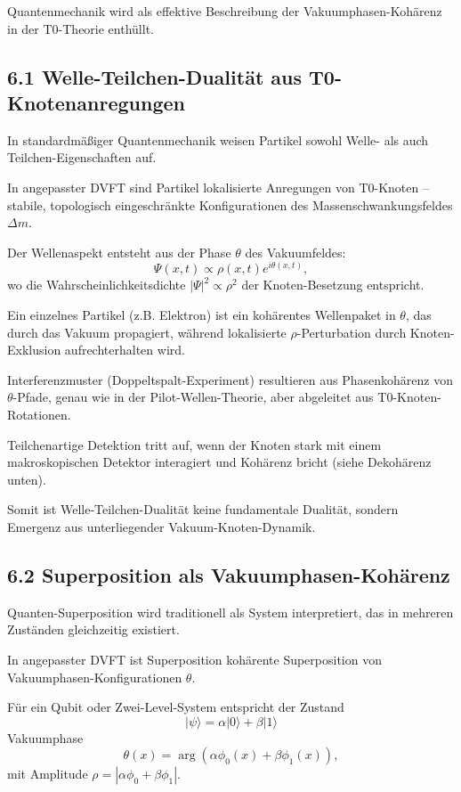	Quantenmechanik wird als effektive Beschreibung der Vakuumphasen-Kohärenz in der T0-Theorie enthüllt.
	
	\subsection{6.1 Welle-Teilchen-Dualität aus T0-Knotenanregungen}
	
	In standardmäßiger Quantenmechanik weisen Partikel sowohl Welle- als auch Teilchen-Eigenschaften auf.
	
	In angepasster DVFT sind Partikel lokalisierte Anregungen von T0-Knoten – stabile, topologisch eingeschränkte Konfigurationen des Massenschwankungsfeldes $\Delta m$.
	
	Der Wellenaspekt entsteht aus der Phase $\theta$ des Vakuumfeldes:
	\[
	\Psi(x,t) \propto \rho(x,t) e^{i\theta(x,t)},
	\]
	wo die Wahrscheinlichkeitsdichte $|\Psi|^2 \propto \rho^2$ der Knoten-Besetzung entspricht.
	
	Ein einzelnes Partikel (z.B. Elektron) ist ein kohärentes Wellenpaket in $\theta$, das durch das Vakuum propagiert, während lokalisierte $\rho$-Perturbation durch Knoten-Exklusion aufrechterhalten wird.
	
	Interferenzmuster (Doppeltspalt-Experiment) resultieren aus Phasenkohärenz von $\theta$-Pfade, genau wie in der Pilot-Wellen-Theorie, aber abgeleitet aus T0-Knoten-Rotationen.
	
	Teilchenartige Detektion tritt auf, wenn der Knoten stark mit einem makroskopischen Detektor interagiert und Kohärenz bricht (siehe Dekohärenz unten).
	
	Somit ist Welle-Teilchen-Dualität keine fundamentale Dualität, sondern Emergenz aus unterliegender Vakuum-Knoten-Dynamik.
	
	\subsection{6.2 Superposition als Vakuumphasen-Kohärenz}
	
	Quanten-Superposition wird traditionell als System interpretiert, das in mehreren Zuständen gleichzeitig existiert.
	
	In angepasster DVFT ist Superposition kohärente Superposition von Vakuumphasen-Konfigurationen $\theta$.
	
	Für ein Qubit oder Zwei-Level-System entspricht der Zustand
	\[
	|\psi\rangle = \alpha |0\rangle + \beta |1\rangle
	\]
	Vakuumphase
	\[
	\theta(x) = \arg(\alpha \phi_0(x) + \beta \phi_1(x)),
	\]
	mit Amplitude $\rho = |\alpha \phi_0 + \beta \phi_1|$.
	

